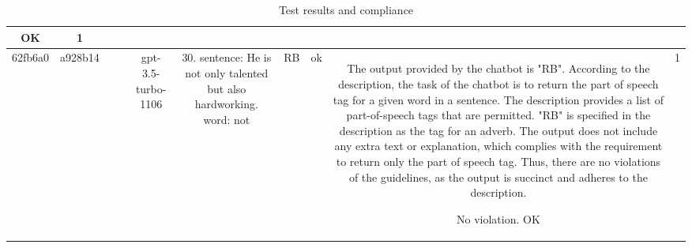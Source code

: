 \begin{table}[h!]
\begin{tabular}{|c|c|c|c|c|c|c|c|c|c|}
OK & 1\\
\hline
62fb6a0 & a928b14 &  &  & gpt-3.5-turbo-1106 & 30. sentence: He is not only talented but also hardworking. word: not & RB & ok & The output provided by the chatbot is "RB". According to the description, the task of the chatbot is to return the part of speech tag for a given word in a sentence. The description provides a list of part-of-speech tags that are permitted. "RB" is specified in the description as the tag for an adverb. The output does not include any extra text or explanation, which complies with the requirement to return only the part of speech tag. Thus, there are no violations of the guidelines, as the output is succinct and adheres to the description.

No violation.
OK & 1
  \end{tabular}
  \caption{Test results and compliance}
  
  \end{table}
  